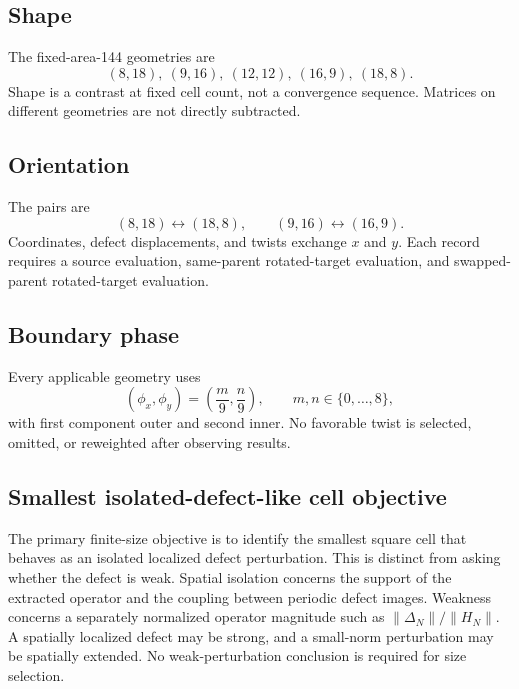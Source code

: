 \documentclass[11pt]{article}
\begin{document}
\subsection{Shape}
The fixed-area-144 geometries are
\begin{equation}
  (8,18),\ (9,16),\ (12,12),\ (16,9),\ (18,8).
\end{equation}
Shape is a contrast at fixed cell count, not a convergence sequence.  Matrices on
different geometries are not directly subtracted.

\subsection{Orientation}
The pairs are
\begin{equation}
  (8,18)\leftrightarrow(18,8),\qquad
  (9,16)\leftrightarrow(16,9).
\end{equation}
Coordinates, defect displacements, and twists exchange $x$ and $y$.  Each record
requires a source evaluation, same-parent rotated-target evaluation, and swapped-parent
rotated-target evaluation.

\subsection{Boundary phase}
Every applicable geometry uses
\begin{equation}
  (\phi_x,\phi_y)=\left(\frac{m}{9},\frac{n}{9}\right),
  \qquad m,n\in\{0,\ldots,8\},
\end{equation}
with first component outer and second inner.  No favorable twist is selected, omitted,
or reweighted after observing results.

\subsection{Smallest isolated-defect-like cell objective}

The primary finite-size objective is to identify the smallest square cell that behaves
as an isolated localized defect perturbation.  This is distinct from asking whether the
defect is weak.  Spatial isolation concerns the support of the extracted operator and
the coupling between periodic defect images.  Weakness concerns a separately normalized
operator magnitude such as $\lVert\Delta_N\rVert/\lVert H_N\rVert$.  A spatially
localized defect may be strong, and a small-norm perturbation may be spatially extended.
No weak-perturbation conclusion is required for size selection.
\end{document}
